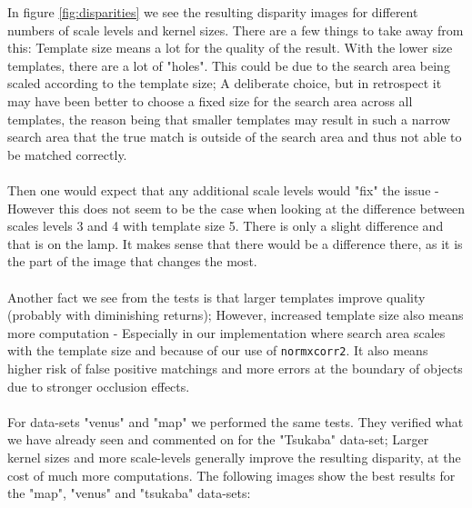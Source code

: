 \documentclass[12pt,a4paper,oneside,final]{article}
\begin{document}
In figure \ref{fig:disparities} we see the resulting disparity images for different numbers of scale levels and kernel sizes. There are a few things to take away from this: Template size means a lot for the quality of the result. With the lower size templates, there are a lot of "holes". This could be due to the search area being scaled according to the template size; A deliberate choice, but in retrospect it may have been better to choose a fixed size for the search area across all templates, the reason being that smaller templates may result in such a narrow search area that the true match is outside of the search area and thus not able to be matched correctly.\\\\
Then one would expect that any additional scale levels would "fix" the issue - However this does not seem to be the case when looking at the difference between scales levels 3 and 4 with template size 5. There is only a slight difference and that is on the lamp. It makes sense that there would be a difference there, as it is the part of the image that changes the most.\\\\
Another fact we see from the tests is that larger templates improve quality (probably with diminishing returns); However, increased template size also means more computation - Especially in our implementation where search area scales with the template size and because of our use of \texttt{normxcorr2}. It also means higher risk of false positive matchings and more errors at the boundary of objects due to stronger occlusion effects.\\\\
For data-sets "venus" and "map" we performed the same tests. They verified what we have already seen and commented on for the "Tsukaba" data-set; Larger kernel sizes and more scale-levels generally improve the resulting disparity, at the cost of much more computations. The following images show the best results for the "map", "venus" and "tsukaba" data-sets:
\end{document}
